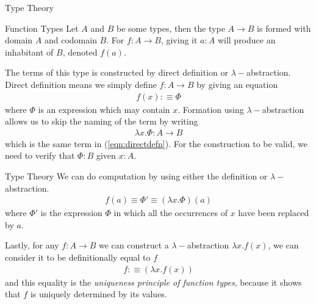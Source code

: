 \documentclass[10pt]{beamer}
\begin{document}
\begin{frame}{Type Theory}
\begin{block}{Function Types}
Let $A$ and $B$ be some types, then the type $A \to B$ is formed with domain $A$ and codomain $B$. For $f:A \to B$, giving it $a:A$ will produce an inhabitant of $B$, denoted $f(a)$.


The terms of this type is constructed by direct definition or $\lambda-$abstraction. Direct definition means we simply define $f :A \to B$ by giving an equation
\begin{align}
f(x): \equiv \Phi \label{eqn:directdefn}
\end{align}
where $\Phi$ is an expression which may contain $x$. Formation using $\lambda-$abstraction allows us to skip the naming of the term by writing
\begin{align*}
\lambda x.\Phi: A \to B
\end{align*}
which is the same term in (\ref{eqn:directdefn}). For the construction to be valid, we need to verify that $\Phi:B$ given $x:A$.
\end{block}
\end{frame}

\begin{frame}{Type Theory}
We can do computation by using either the definition or $\lambda-$abstraction.
\begin{align*}
f(a) \equiv \Phi' \equiv (\lambda x.\Phi)(a)
\end{align*}
where $\Phi'$ is the expression $\Phi$ in which all the occurrences of $x$ have been replaced by $a$.

Lastly, for any $f:A \to B$ we can construct a $\lambda-$abstraction $\lambda x.f(x)$, we can consider it to be definitionally equal to $f$
\begin{align*}
f: \equiv (\lambda x.f(x))
\end{align*}
and this equality is the \emph{uniqueness principle of function types}, because it shows that $f$ is uniquely determined by its values.
\end{frame}
\end{document}
